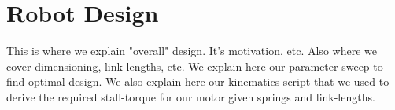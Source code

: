 \section{Robot Design}

This is where we explain "overall" design. It's motivation, etc. 
Also where we cover dimensioning, link-lengths, etc. 
We explain here our parameter sweep to find optimal design. 
We also explain here our kinematics-script that we used to derive the required stall-torque for our motor given springs and link-lengths. 

\subsection{}

\subsection{}